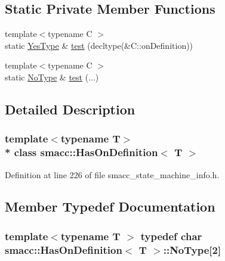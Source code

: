 \subsection*{Static Private Member Functions}
\begin{DoxyCompactItemize}
\item 
{\footnotesize template$<$typename C $>$ }\\static \hyperlink{classsmacc_1_1HasOnDefinition_af147416543b9d5a19d3dfc4f3f0d42a6}{Yes\+Type} \& \hyperlink{classsmacc_1_1HasOnDefinition_ab3431b8ab4f2d559df5bee2c06e75d39}{test} (decltype(\&C\+::on\+Definition))
\item 
{\footnotesize template$<$typename C $>$ }\\static \hyperlink{classsmacc_1_1HasOnDefinition_ab424fbc32a091d6271cabe47eb0725ca}{No\+Type} \& \hyperlink{classsmacc_1_1HasOnDefinition_a1cd0d70f99ffb2ac329a72e61815d5e4}{test} (...)
\end{DoxyCompactItemize}


\subsection{Detailed Description}
\subsubsection*{template$<$typename T$>$\\*
class smacc\+::\+Has\+On\+Definition$<$ T $>$}



Definition at line 226 of file smacc\+\_\+state\+\_\+machine\+\_\+info.\+h.



\subsection{Member Typedef Documentation}
\subsubsection[{\texorpdfstring{No\+Type}{NoType}}]{\setlength{\rightskip}{0pt plus 5cm}template$<$typename T $>$ typedef char {\bf smacc\+::\+Has\+On\+Definition}$<$ T $>$\+::No\+Type\mbox{[}2\mbox{]}\hspace{0.3cm}{\ttfamily [private]}}\hypertarget{classsmacc_1_1HasOnDefinition_ab424fbc32a091d6271cabe47eb0725ca}{}\label{classsmacc_1_1HasOnDefinition_ab424fbc32a091d6271cabe47eb0725ca}


